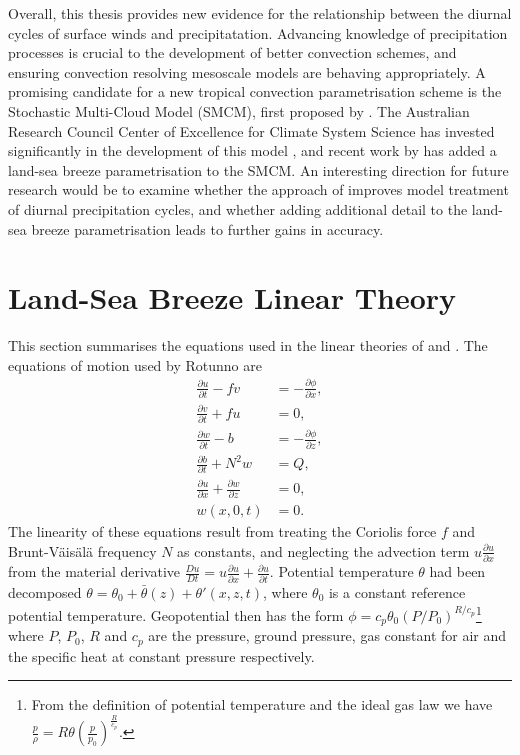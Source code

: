\documentclass[12pt]{book}
\begin{document}
Overall, this thesis provides new evidence for the relationship between the diurnal cycles of surface winds and precipitatation. Advancing knowledge of precipitation processes is crucial to the development of better convection schemes, and ensuring convection resolving mesoscale models are behaving appropriately. A promising candidate for a new tropical convection parametrisation scheme is the Stochastic Multi-Cloud Model (SMCM), first proposed by \citet{khouider09}. The Australian Research Council Center of Excellence for Climate System Science has invested significantly in the development of this model \citep{peters13,dorrestijn15,peters17}, and recent work by \citet{bergemann17} has added a land-sea breeze parametrisation to the SMCM. An interesting direction for future research would be to examine whether the approach of \citet{bergemann17} improves model treatment of diurnal precipitation cycles, and whether adding additional detail to the land-sea breeze parametrisation leads to further gains in accuracy.

\appendix

\chapter{Land-Sea Breeze Linear Theory}
\label{Ap:Linear}
This section summarises the equations used in the linear theories of \citet{rotunno83} and \citet{qian09}. The equations of motion used by Rotunno are 
\begin{align}
\frac{\partial u}{\partial t}-fv&=-\frac{\partial \phi}{\partial x}, \\
\frac{\partial v}{\partial t}+fu&=0, \\
\frac{\partial w}{\partial t}-b&=-\frac{\partial \phi}{\partial z},\\
\frac{\partial b}{\partial t}+N^2w&=Q, \\
\frac{\partial u}{\partial x}+\frac{\partial w}{\partial z}&=0, \\
w(x,0,t)&=0.
\end{align}
The linearity of these equations result from treating the Coriolis force $f$ and Brunt-V\"{a}is\"{a}l\"{a} frequency $N$ as constants, and neglecting the advection term $u\frac{\partial u}{\partial x}$ from the material derivative $\frac{D u}{D t}=u\frac{\partial u}{\partial x}+\frac{\partial u}{\partial t}$. Potential temperature $\theta$ had been decomposed $\theta=\theta_0+\bar{\theta}(z)+\theta'(x,z,t)$, where $\theta_0$ is a constant reference potential temperature. Geopotential then has the form $\phi=c_p \theta_0 (P/P_0)^{R/c_p}$\footnote{From the definition of potential temperature and the ideal gas law we have $\frac{p}{\rho}=R\theta\left(\frac{p}{p_0}\right)^{\frac{R}{c_p}}$.} where $P$, $P_0$, $R$ and $c_p$ are the pressure, ground pressure, gas constant for air and the specific heat at constant pressure respectively. 
\end{document}

